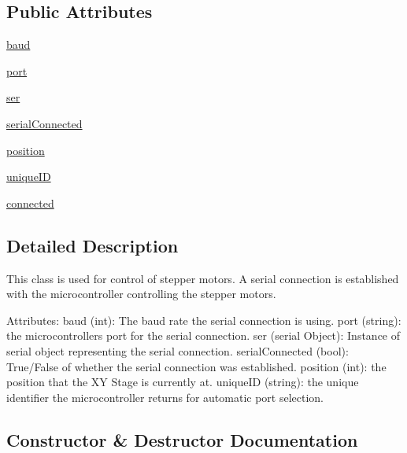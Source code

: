 \subsection*{Public Attributes}
\begin{DoxyCompactItemize}
\item 
\mbox{\hyperlink{class_collection_1_1_collectador_a06c835183d4c66cf6c91c2e34ee3e2b6}{baud}}
\item 
\mbox{\hyperlink{class_collection_1_1_collectador_a550345b45c253014500953908ed1a995}{port}}
\item 
\mbox{\hyperlink{class_collection_1_1_collectador_ad9a27d34d324f18bffea08b5aee3a765}{ser}}
\item 
\mbox{\hyperlink{class_collection_1_1_collectador_a6118ba10835a3655e0a048fadf444942}{serial\+Connected}}
\item 
\mbox{\hyperlink{class_collection_1_1_collectador_aa037ff041a29101bf42cde6fdb21061c}{position}}
\item 
\mbox{\hyperlink{class_collection_1_1_collectador_a13c3d036cddedace173688b51df275d5}{unique\+ID}}
\item 
\mbox{\hyperlink{class_collection_1_1_collectador_a63f1c56b2b8bc80791fae03b9f6026ef}{connected}}
\end{DoxyCompactItemize}


\subsection{Detailed Description}
\begin{DoxyVerb}This class is used for control of stepper motors. A serial connection is established with the microcontroller controlling the stepper motors.

Attributes:
    baud (int): The baud rate the serial connection is using.
    port (string): the microcontrollers port for the serial connection.
    ser (serial Object): Instance of serial object representing the serial connection.
    serialConnected (bool): True/False of whether the serial connection was established.
    position (int): the position that the XY Stage is currently at.
    uniqueID (string): the unique identifier the microcontroller returns for automatic port selection.
\end{DoxyVerb}
 

\subsection{Constructor \& Destructor Documentation}
\mbox{\label{class_collection_1_1_collectador_af9b0ad6313049442cdc6e924a017693e}} 
